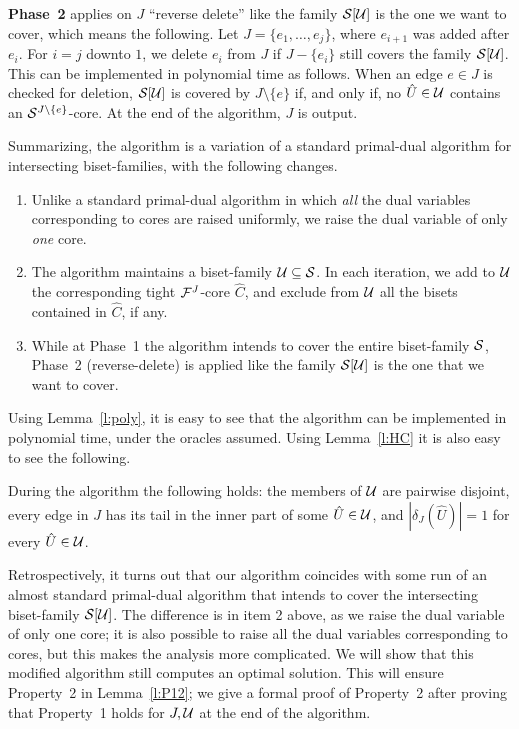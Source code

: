 {\bf Phase~2} applies on $J$ ``reverse delete'' like the family ${\cal S}[{\cal U}]$ 
is the one we want to cover, which means the following.
Let $J=\{e_1, \ldots, e_j\}$, where $e_{i+1}$ was added after $e_i$. 
For $i=j$ downto $1$, we delete $e_i$ from $J$ if $J-\{e_i\}$ still covers 
the family ${\cal S}[{\cal U}]$.
This can be implemented in polynomial time as follows. 
When an edge $e \in J$ is checked for deletion,
${\cal S}[{\cal U}]$ is covered by $J \setminus \{e\}$ if, and only if, 
no $\hat{U} \in {\cal U}$ contains an ${\cal S}^{J \setminus \{e\}}$-core.   
At the end of the algorithm, $J$ is output.

\vspace{0.2cm}

Summarizing, the algorithm is a variation of a standard primal-dual algorithm 
for intersecting biset-families, with the following changes.
\begin{enumerate}
\item
Unlike a standard primal-dual algorithm in which {\em all} the dual variables corresponding to 
cores are raised uniformly, we raise the dual variable of only {\em one} core.
\item
The algorithm maintains a biset-family ${\cal U} \subseteq {\cal S}$.
In each iteration, we add to ${\cal U}$ the corresponding tight ${\cal F}^J$-core $\hat{C}$,
and exclude from ${\cal U}$ all the bisets contained in $\hat{C}$, if any.
\item
While at Phase~1 the algorithm intends to cover the entire biset-family ${\cal S}$,
Phase~2 (reverse-delete) is applied like the family ${\cal S}[{\cal U}]$ is the one that we want to cover.
\end{enumerate}

Using Lemma~\ref{l:poly}, it is easy to see that the algorithm can be implemented in polynomial time,
under the oracles assumed. Using Lemma~\ref{l:HC} it is also easy to see the following.

\begin{claim} \label{c:feasible}
During the algorithm the following holds:
the members of ${\cal U}$ are pairwise disjoint,
every edge in $J$ has its tail in the inner part of some $\hat{U} \in {\cal U}$, and
$|\delta_{J}(\hat{U})|=1$ for every $\hat{U} \in {\cal U}$.
\end{claim}

Retrospectively, it turns out that our algorithm coincides with some run of an almost 
standard primal-dual algorithm that intends to cover the intersecting biset-family ${\cal S}[{\cal U}]$. 
The difference is in item 2 above, as we raise the dual variable of only one core;
it is also possible to raise all the dual variables corresponding to cores,
but this makes the analysis more complicated.
We will show that this modified algorithm still computes an optimal solution.
This will ensure Property~2 in Lemma~\ref{l:P12}; we give a formal proof of Property~2 after
proving that Property~1 holds for $J,{\cal U}$ at the end of the algorithm.

